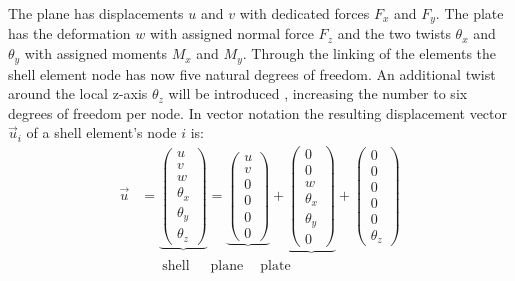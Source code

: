  The plane has displacements $u$ and $v$ with dedicated forces $F_x$ and $F_y$. The plate has the deformation $w$ with assigned normal force $F_z$ and the two twists $\theta_x$ and $\theta_y$ with assigned moments $M_x$ and $M_y$. Through the linking of the elements the shell element node has now five natural degrees of freedom. An additional twist around the local z-axis $\theta_z$ will be introduced \cite{steinke2005finite}, increasing the number to six degrees of freedom per node. In vector notation the resulting displacement vector $\vec{u}_i$ of a shell element's node $i$ is:
 \begin{align}\label{eq:shell_u_i}
 \vec{u} &= \underbrace{\begin{pmatrix}
 	u\\v\\w\\\theta_x\\\theta_y\\\theta_z
 	\end{pmatrix}} = \underbrace{\begin{pmatrix}
 	u\\v\\0\\0\\0\\0
 	\end{pmatrix}} + \underbrace{\begin{pmatrix}
 	0\\0\\w\\\theta_x\\\theta_y\\0
 	\end{pmatrix}} + \begin{pmatrix}
 0\\0\\0\\0\\0\\\theta_z
 \end{pmatrix}\\
 &\quad\;\; \text{shell}\ \quad\; \text{plane}\ \quad\! \text{plate}
 \end{align}
 
